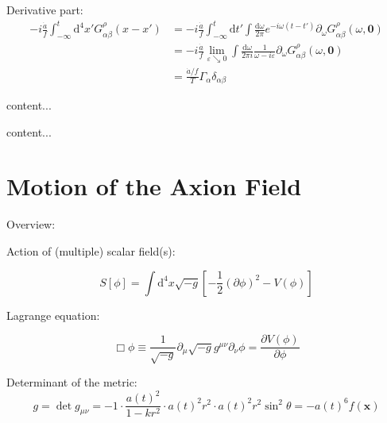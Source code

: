 \documentclass[master,       %
               twoside,        %
               BCOR10mm,       %
               english,ngerman, %
               ]{GAUBM}
\begin{document}
\begin{otherlanguage}{english}
Derivative part:
\begin{align}
	- i \frac{\dot{a}}{f} \int_{-  \infty}^t \mathrm{d}^4 x' G^\rho_{\alpha \beta}(x - x') &= - i \frac{\dot{a}}{f} \int_{-  \infty}^t \mathrm{d} t' \int \frac{\mathrm{d} \omega}{2\pi} e^{- i \omega (t - t')} \partial_\omega G^\rho_{\alpha \beta}(\omega, \mathbf{0}) \nonumber \\
	&= - i \frac{\dot{a}}{f} \lim_{\varepsilon \searrow 0} \int \frac{\mathrm{d} \omega}{2\pi i} \frac{1}{\omega - i \varepsilon} \partial_\omega G^\rho_{\alpha \beta}(\omega, \mathbf{0}) \nonumber \\
	&= \frac{\dot{a} / f}{T} \Gamma_\alpha \delta_{\alpha \beta}
\end{align}


\begin{table}[h]
	content...
\end{table}


\begin{table}
	content...
\end{table}



\chapter{Motion of the Axion Field}

Overview: \cite{MarshAxionCosmo}

Action of (multiple) scalar field(s):

\begin{equation}
	S[\phi] = \int \mathrm{d}^4 x \sqrt{-g} \left[- \frac{1}{2} (\partial \phi)^2 - V(\phi) \right]
\end{equation}


Lagrange equation:

\begin{equation}
	\Box \phi \equiv \frac{1}{\sqrt{-g}} \partial_\mu \sqrt{-g} g^{\mu \nu} \partial_\nu \phi = \frac{\partial V(\phi)}{\partial \phi}
\end{equation}

Determinant of the metric:
\begin{equation}
	g = \det g_{\mu \nu} = -1 \cdot \frac{a(t)^2}{1 - kr^2} \cdot a(t)^2 r^2 \cdot a(t)^2 r^2 \sin^2 \theta = - a(t)^6 f(\mathbf{x})
\end{equation}


\end{otherlanguage}
\end{document}
